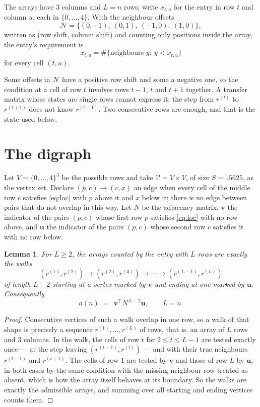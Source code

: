 \documentclass[11pt,a4paper]{article}
\theoremstyle{plain}
\newtheorem{lemma}[theorem]{Lemma}
\theoremstyle{definition}
\begin{document}
The arrays have $3$ columns and $L=n$ rows; write $x_{t,u}$ for the entry in
row $t$ and column $u$, each in $\{0,\dots,4\}$. With the neighbour offsets
\[
\mathcal N=\{(0,-1),\ (0,1),\ (-1,0),\ (1,0)\},
\]
written as (row shift, column shift) and counting only positions inside the array, the
entry's requirement is
\begin{equation}\label{eq:loc}
x_{t,u}=\#\{\text{neighbours }y:\ y<x_{t,u}\}
\end{equation}
for every cell $(t,u)$.

Some offsets in $\mathcal N$ have a positive row shift and some a negative one, so the
condition at a cell of row $t$ involves rows $t-1$, $t$ and $t+1$ together. A transfer
matrix whose states are single rows cannot express it: the step from $r^{(t)}$ to
$r^{(t+1)}$ does not know $r^{(t-1)}$. Two consecutive rows are enough, and that is
the state used below.

\section{The digraph}

Let $V=\{0,\dots,4\}^{3}$ be the possible rows and take
$\mathcal V=V\times V$, of size $S=15625$, as the vertex set. Declare $(p,c)\to(c,x)$ an edge
when every cell of the middle row $c$ satisfies \eqref{eq:loc} with $p$ above it and $x$
below it; there is no edge between pairs that do not overlap in this way. Let $N$ be the
adjacency matrix, $\mathbf{v}$ the indicator of the pairs $(p,c)$ whose first row $p$
satisfies \eqref{eq:loc} with no row above, and $\mathbf{u}$ the indicator of
the pairs $(p,c)$ whose second row $c$ satisfies it with no row below.

\begin{lemma}\label{lem:walk}
For $L\ge2$, the arrays counted by the entry with $L$ rows are exactly the walks
\[
(r^{(1)},r^{(2)})\to(r^{(2)},r^{(3)})\to\cdots\to(r^{(L-1)},r^{(L)})
\]
of length $L-2$ starting at a vertex marked by $\mathbf{v}$ and ending at one marked by
$\mathbf{u}$. Consequently
\[
a(n)\;=\;\,\mathbf{v}^{\!\top}N^{\,L-2}\mathbf{u},\qquad L=n .
\]
\end{lemma}

\begin{proof}
Consecutive vertices of such a walk overlap in one row, so a walk of that shape is
precisely a sequence $r^{(1)},\dots,r^{(L)}$ of rows, that is, an array of $L$ rows
and $3$ columns. In the walk, the cells of row $t$ for $2\le t\le L-1$ are tested
exactly once --- at the step leaving $(r^{(t-1)},r^{(t)})$ --- and with their true
neighbours $r^{(t-1)}$ and $r^{(t+1)}$. The cells of row $1$ are tested by
$\mathbf{v}$ and those of row $L$ by $\mathbf{u}$, in both cases by the same condition
with the missing neighbour row treated as absent, which is how the array itself behaves at
its boundary. So the walks are exactly the admissible arrays, and summing over all starting
and ending vertices counts them.
\end{proof}
\end{document}
